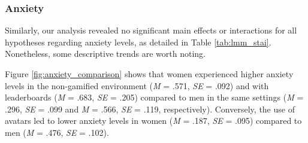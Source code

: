 \subsubsection{Anxiety}
Similarly, our analysis revealed no significant main effects or interactions for all hypotheses regarding anxiety levels, as detailed in Table \ref{tab:lmm_stai}.
Nonetheless, some descriptive trends are worth noting.

Figure \ref{fig:anxiety_comparison} shows that women experienced higher anxiety levels in the non-gamified environment (\textit{M} = .571, \textit{SE} = .092) and with leaderboards (\textit{M} = .683, \textit{SE} = .205) compared to men in the same settings (\textit{M} = .296, \textit{SE} = .099 and \textit{M} = .566, \textit{SE} = .119, respectively). Conversely, the use of avatars led to lower anxiety levels in women (\textit{M} = .187, \textit{SE} = .095) compared to men (\textit{M} = .476, \textit{SE} = .102).


